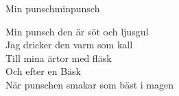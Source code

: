 \begin{song}{Min punsch}{minpunsch}
\begin{vers}
\repopen Min punsch den är söt och ljusgul\\
Jag dricker den varm som kall\\
Till mina ärtor med fläsk\\
Och efter en Bäsk\\
När punschen smakar som bäst i magen \repclose\\
\end{vers}
\end{song}
